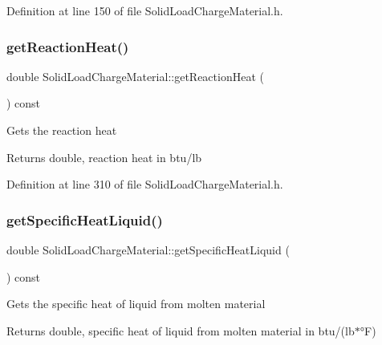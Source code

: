 Definition at line 150 of file Solid\+Load\+Charge\+Material.\+h.

\mbox{\label{class_solid_load_charge_material_a3481dc84063babc3514a4173e6bd9341}} 
\subsubsection{\texorpdfstring{get\+Reaction\+Heat()}{getReactionHeat()}}
{\footnotesize\ttfamily double Solid\+Load\+Charge\+Material\+::get\+Reaction\+Heat (\begin{DoxyParamCaption}{ }\end{DoxyParamCaption}) const\hspace{0.3cm}{\ttfamily [inline]}}

Gets the reaction heat \begin{DoxyReturn}{Returns}
double, reaction heat in btu/lb 
\end{DoxyReturn}


Definition at line 310 of file Solid\+Load\+Charge\+Material.\+h.

\mbox{\label{class_solid_load_charge_material_a8b02308194b603276df3a894c401e923}} 
\subsubsection{\texorpdfstring{get\+Specific\+Heat\+Liquid()}{getSpecificHeatLiquid()}}
{\footnotesize\ttfamily double Solid\+Load\+Charge\+Material\+::get\+Specific\+Heat\+Liquid (\begin{DoxyParamCaption}{ }\end{DoxyParamCaption}) const\hspace{0.3cm}{\ttfamily [inline]}}

Gets the specific heat of liquid from molten material \begin{DoxyReturn}{Returns}
double, specific heat of liquid from molten material in btu/(lb$\ast$°F) 
\end{DoxyReturn}


